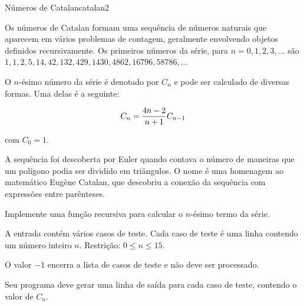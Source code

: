 \documentclass[12pt,a4paper,oneside]{article}
\begin{document}
\begin{problem}{Números de Catalan}{catalan}{2}
 
Os números de Catalan formam uma sequência de números naturais que
aparecem em vários problemas de contagem, geralmente envolvendo objetos
definidos recursivamente. Os primeiros números da série, para $n = 0, 1, 2, 3, \dots$ são $1, 1, 2, 5, 14, 42, 132, 429, 1430, 4862, 16796, 58786, \dots$

O $n$-ésimo número da série é denotado por $C_n$ e pode ser calculado de diversas formas. Uma delas é a seguinte:

\begin{equation}
C_n = \frac{4n-2}{n+1}C_{n-1}\notag
\end{equation}

com $C_0=1$.

A sequência foi descoberta por Euler quando contava o número de maneiras que um polígono podia ser dividido em triângulos. O nome é uma homenagem ao matemático Eugène Catalan, que descobriu a conexão da sequência com
expressões entre parênteses.

Implemente uma função recursiva para calcular o $n$-ésimo termo da série.

%

\InputFile

A entrada contém vários casos de teste. Cada caso de teste é uma linha contendo um número inteiro $n$. Restrição: $0 \leq n \leq 15$.

 O valor $-1$ encerra a lista de casos de teste e não deve ser processado.

\OutputFile

Seu programa deve gerar uma linha de saída para cada caso de teste, contendo o valor de $C_n$.


\Example

\begin{example}
%
\end{example}


\end{problem}
\end{document}
